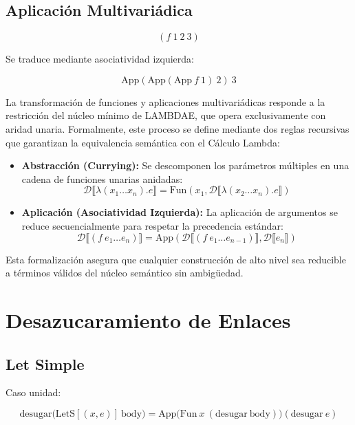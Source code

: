 \documentclass[a4paper,12pt]{article}
\begin{document}
\begin{tcolorbox}[title= Corrección: Desugar modulo A4, breakable]
\subsection{Aplicación Multivariádica}

\[
(f\ 1\ 2\ 3)
\]

Se traduce mediante asociatividad izquierda:

\[
\mathrm{App}(\mathrm{App}(\mathrm{App}\ f\ 1)\ 2)\ 3
\]

\vspace{0,5 cm}\textbf{} La transformación de funciones y aplicaciones multivariádicas responde a la restricción del núcleo mínimo de LAMBDAE, que opera exclusivamente con aridad unaria. Formalmente, este proceso se define mediante dos reglas recursivas que garantizan la equivalencia semántica con el Cálculo Lambda:\begin{itemize} \item \textbf{Abstracción (Currying):} Se descomponen los parámetros múltiples en una cadena de funciones unarias anidadas:$$\mathcal{D}\llbracket \lambda(x_1 \dots x_n). e \rrbracket = \text{Fun}(x_1, \mathcal{D}\llbracket \lambda(x_2 \dots x_n). e \rrbracket)$$\item \textbf{Aplicación (Asociatividad Izquierda):} La aplicación de argumentos se reduce secuencialmente para respetar la precedencia estándar:
\[
\mathcal{D}\llbracket (f \ e_1 \dots e_n) \rrbracket = \text{App}(\mathcal{D}\llbracket (f \ e_1 \dots e_{n-1}) \rrbracket, \mathcal{D}\llbracket e_n \rrbracket)
\]
\end{itemize} Esta formalización asegura que cualquier construcción de alto nivel sea reducible a términos válidos del núcleo semántico sin ambigüedad.



\section{Desazucaramiento de Enlaces}

\subsection{Let Simple}

Caso unidad:

\[
\mathrm{desugar}\bigl(\mathrm{LetS}[(x,e)]\ \text{body}\bigr)
=
\mathrm{App}\bigl( \mathrm{Fun}\ x\ (\mathrm{desugar}\ \text{body}) \bigr)
               (\mathrm{desugar}\ e)
\]


\end{tcolorbox}
\end{document}
